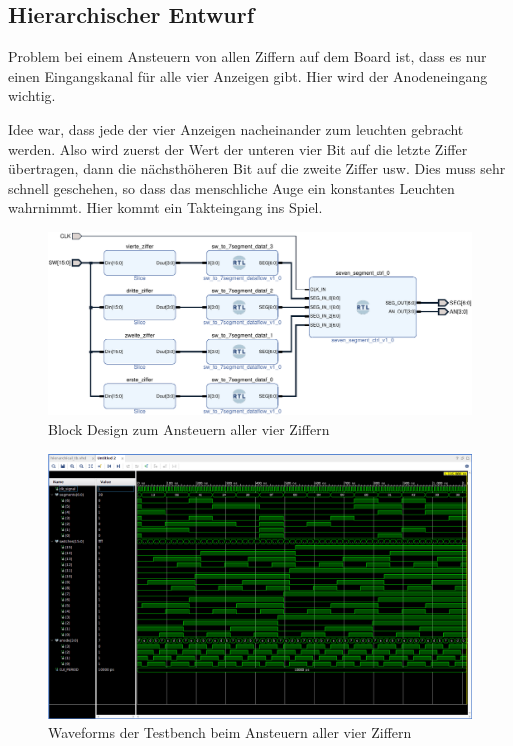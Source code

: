 \documentclass[11pt, a4paper]{article}
\begin{document}
\newpage
\subsection*{Hierarchischer Entwurf}
Problem bei einem Ansteuern von allen Ziffern auf dem Board ist, dass es nur einen Eingangskanal für alle vier Anzeigen gibt. Hier wird der Anodeneingang wichtig.

Idee war, dass jede der vier Anzeigen nacheinander zum leuchten gebracht werden.
Also wird zuerst der Wert der unteren vier Bit auf die letzte Ziffer übertragen, dann die nächsthöheren Bit auf die zweite Ziffer usw. Dies muss sehr schnell geschehen, so dass das menschliche Auge ein konstantes Leuchten wahrnimmt. Hier kommt ein Takteingang ins Spiel.

\begin{figure}[H]    
    \centering
    \includegraphics[width=\linewidth]{versuch3Data/hierarchical_display.pdf}
    \caption{Block Design zum Ansteuern aller vier Ziffern}
    \label{aufbauHierarchie}        
\end{figure}
\begin{figure}[H]    
    \centering
    \includegraphics[width=\linewidth]{versuch3Data/hierarchical.png}
    \caption{Waveforms der Testbench beim Ansteuern aller vier Ziffern}
    \label{waveformHierarchie}        
\end{figure}
\end{document}
